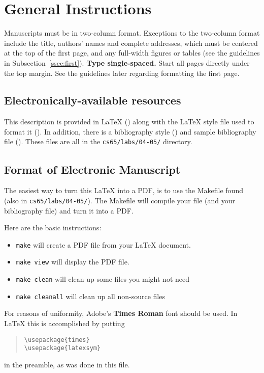 \documentclass[11pt]{article}
\begin{document}
\section{General Instructions}

Manuscripts must be in two-column format.  Exceptions to the
two-column format include the title, authors' names and complete
addresses, which must be centered at the top of the first page, and
any full-width figures or tables (see the guidelines in
Subsection~\ref{ssec:first}). {\bf Type single-spaced.}  Start all
pages directly under the top margin. See the guidelines later
regarding formatting the first page.

\subsection{Electronically-available resources}

This description is provided in \LaTeX{} () along
with the \LaTeX{} style file used to format it
().  In addition, there is a bibliography style
() and sample bibliography file
().  These files are all in the {\tt cs65/labs/04-05/}
directory.

\subsection{Format of Electronic Manuscript}
\label{sect:pdf}

The easiest way to turn this \LaTeX{} into a PDF, is to use the
Makefile found (also in {\tt cs65/labs/04-05/}).  The Makefile will
compile your file (and your bibliography file) and turn it into a PDF.

Here are the basic instructions:
\begin{itemize}
\item {\tt make} will create a PDF file from your \LaTeX{} document.
\item {\tt make view} will display the PDF file. 
\item {\tt make clean} will clean up some files you might not need
\item {\tt make cleanall} will clean up all non-source files
\end{itemize}

For reasons of uniformity, Adobe's {\bf Times Roman} font should be
used. In \LaTeX{} this is accomplished by putting

\begin{quote}
\begin{verbatim}
\usepackage{times}
\usepackage{latexsym}
\end{verbatim}
\end{quote}
in the preamble, as was done in this file.
\end{document}
